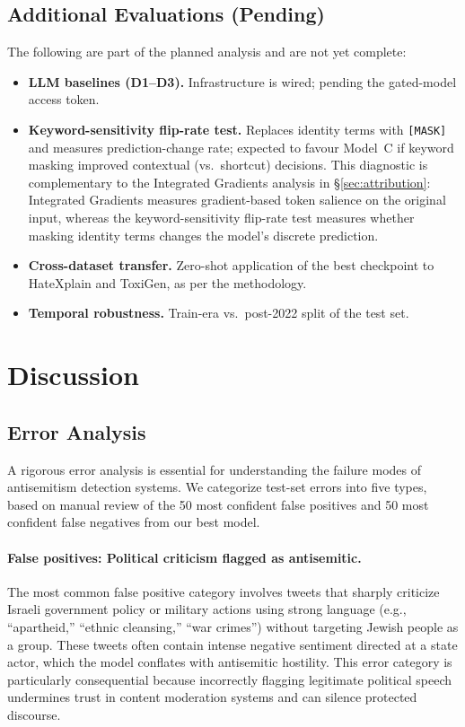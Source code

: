 \documentclass[10pt,a4paper]{article}
\begin{document}
\subsection{Additional Evaluations (Pending)}

The following are part of the planned analysis and are not yet complete:

\begin{itemize}[leftmargin=*,itemsep=1pt]
  \item \textbf{LLM baselines (D1--D3).} Infrastructure is wired; pending the gated-model access token.
  \item \textbf{Keyword-sensitivity flip-rate test.} Replaces identity terms with \texttt{[MASK]} and measures prediction-change rate; expected to favour Model~C if keyword masking improved contextual (vs.\ shortcut) decisions. This diagnostic is complementary to the Integrated Gradients analysis in \S\ref{sec:attribution}: Integrated Gradients measures gradient-based token salience on the original input, whereas the keyword-sensitivity flip-rate test measures whether masking identity terms changes the model's discrete prediction.
  \item \textbf{Cross-dataset transfer.} Zero-shot application of the best checkpoint to HateXplain and ToxiGen, as per the methodology.
  \item \textbf{Temporal robustness.} Train-era vs.\ post-2022 split of the test set.
\end{itemize}



\section{Discussion}
\label{sec:discussion}

\subsection{Error Analysis}

A rigorous error analysis is essential for understanding the failure modes of antisemitism detection systems. We categorize test-set errors into five types, based on manual review of the 50 most confident false positives and 50 most confident false negatives from our best model.

\paragraph{False positives: Political criticism flagged as antisemitic.}
The most common false positive category involves tweets that sharply criticize Israeli government policy or military actions using strong language (e.g., ``apartheid,'' ``ethnic cleansing,'' ``war crimes'') without targeting Jewish people as a group. These tweets often contain intense negative sentiment directed at a state actor, which the model conflates with antisemitic hostility. This error category is particularly consequential because incorrectly flagging legitimate political speech undermines trust in content moderation systems and can silence protected discourse.
\end{document}
